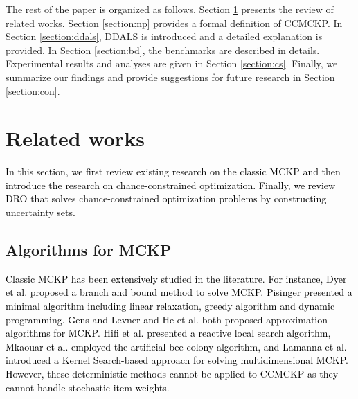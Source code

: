 \documentclass[lettersize,journal]{IEEEtran}
\begin{document}
The rest of the paper is organized as follows.
Section \ref{section:rw} presents the review of related works. 
Section \ref{section:np} provides a formal definition of CCMCKP. 
In Section \ref{section:ddals}, DDALS is introduced and a detailed explanation is provided. 
In Section \ref{section:bd}, the benchmarks are described in details. 
Experimental results and analyses are given in Section \ref{section:cs}. 
Finally, we summarize our findings and provide suggestions for future research in Section \ref{section:con}.

\section{Related works}
\label{section:rw}
\textcolor{black}{
In this section, we first review existing research on the classic MCKP and then introduce the research on chance-constrained optimization.
Finally, we review DRO that solves chance-constrained optimization problems by constructing uncertainty sets.}

\subsection{Algorithms for MCKP}
\textcolor{black}{
Classic MCKP has been extensively studied in the literature. 
For instance, Dyer et al. \cite{dyer1984branch} proposed a branch and bound method to solve MCKP. 
Pisinger \cite{pisinger1995minimal} presented a minimal algorithm including linear relaxation, greedy algorithm and dynamic programming. 
Gens and Levner \cite{gens1998approximate} and He et al. \cite{he2016improved} both proposed approximation algorithms for MCKP.
Hifi et al. \cite{hifi2006reactive} presented a reactive local search algorithm, Mkaouar et al. \cite{mkaouar2020solving} employed the artificial bee colony algorithm, and Lamanna et al. \cite{lamanna2022two} introduced a Kernel Search-based approach for solving multidimensional MCKP.
However, these deterministic methods cannot be applied to CCMCKP as they cannot handle stochastic item weights.
}
\end{document}
